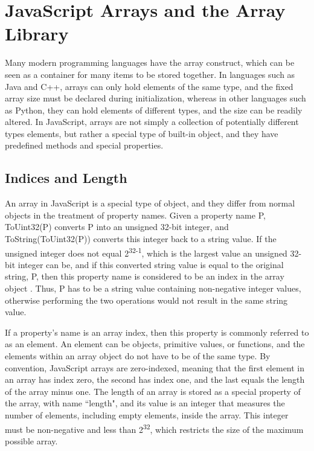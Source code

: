 \documentclass[a4paper,11pt,twoside]{report}
\begin{document}
\chapter{JavaScript Arrays and the Array Library}
Many modern programming languages have the array construct, which can be seen as a container for many items to be stored together. In languages such as Java and C++, arrays can only hold elements of the same type, and the fixed array size must be declared during initialization, whereas in other languages such as Python, they can hold elements of different types, and the size can be readily altered. In JavaScript, arrays are not simply a collection of potentially different types elements, but rather a special type of built-in object, and they have predefined methods and special properties. 

\section{Indices and Length}
An array in JavaScript is a special type of object, and they differ from normal objects in the treatment of property names. Given a property name P, ToUint32(P) converts P into an unsigned 32-bit integer, and ToString(ToUint32(P)) converts this integer back to a string value. If the unsigned integer does not equal 2\textsuperscript{32-1}, which is the largest value an unsigned 32-bit integer can be, and if this converted string value is equal to the original string, P, then this property name is considered to be an index in the array object \cite{EcmaScript}. Thus, P has to be a string value containing non-negative integer values, otherwise performing the two operations would not result in the same string value. 

If a property's name is an array index, then this property is commonly referred to as an element. An element can be objects, primitive values, or functions, and the elements within an array object do not have to be of the same type. By convention, JavaScript arrays are zero-indexed, meaning that the first element in an array has index zero, the second has index one, and the last equals the length of the array minus one. The length of an array is stored as a special property of the array, with name ``length", and its value is an integer that measures the number of elements, including empty elements, inside the array. This integer must be non-negative and less than 2\textsuperscript{32}, which restricts the size of the maximum possible array. 
\end{document}
